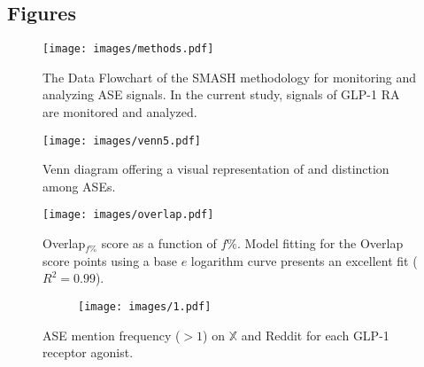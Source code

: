 \documentclass[referee,bst/sn-basic]{sn-jnl}%
\begin{document}
\subsection*{Figures}

\begin{figure}[H]
    \centering
    \texttt{[image: images/methods.pdf]}
    \caption{The Data Flowchart of the SMASH methodology for monitoring and analyzing ASE signals.
    In the current study, signals of GLP-1 RA are monitored and analyzed.}
    \label{fig:methods}
\end{figure}





\begin{sidewaysfigure}
    \centering
    \texttt{[image: images/venn5.pdf]}
    \caption{Venn diagram offering a visual representation of and distinction among ASEs.}
    \label{fig:venn}
\end{sidewaysfigure}


\begin{figure}[H]
    \centering
    \texttt{[image: images/overlap.pdf]}
    \caption{Overlap$_{f\%}$ score as a function of ${f\%}$.
    Model fitting for the Overlap score points using a base $e$ logarithm curve presents an excellent fit ($R^2=0.99$).
    }
    \label{fig:overlap}
\end{figure}


\begin{figure}[H]
    \ContinuedFloat
    \centering
    \begin{subfigure}[b]{\textwidth}
        \centering
        \texttt{[image: images/1.pdf]}
        \label{fig:drg_ase_35a}
    \end{subfigure}
    \caption{ASE mention frequency ($>1$) on $\mathbb{X}$ and Reddit for each GLP-1 receptor agonist.}
    \label{fig:drg_ase_35}
\end{figure}
\end{document}
